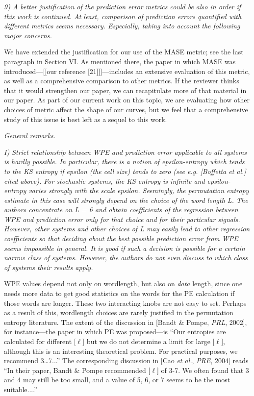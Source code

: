 \documentclass[12pt]{article}
\newcommand{\alert}[1]{{\color{red}#1}}
\begin{document}
\smallskip

\emph{9) A better justification of the prediction error metrics could
  be also in order if this work is continued. At least, comparison of
  prediction errors quantified with different metrics seems
  necessary. Especially, taking into account the following major
  concerns.}

We have extended the justification for our use of the MASE metric; see
the last paragraph in Section VI.  As mentioned there, the paper in
which MASE was introduced---\alert{[[our reference [21]]]}---includes
an extensive evaluation of this metric, as well as a comprehensive
comparison to other metrics.  If the reviewer thinks that it would
strengthen our paper, we can recapitulate more of that material in our
paper.  As part of our current work on this topic, we are evaluating
how other choices of metric affect the shape of our curves, but we
feel that a comprehensive study of this issue is best left as a sequel
to this work.

\smallskip

\noindent\emph{General remarks.}

\emph{I) Strict relationship between WPE and prediction error
  applicable to all systems is hardly possible. In particular, there
  is a notion of epsilon-entropy which tends to the KS entropy if
  epsilon (the cell size) tends to zero (see e.g.  [Boffetta et al.]
  cited above). For stochastic systems, the KS entropy is infinite and
  epsilon-entropy varies strongly with the scale epsilon. Seemingly,
  the permutation entropy estimate in this case will strongly depend
  on the choice of the word length L. The authors concentrate on L = 6
  and obtain coefficients of the regression between WPE and prediction
  error only for that choice and for their particular
  signals. However, other systems and other choices of L may easily
  lead to other regression coefficients so that deciding about the
  best possible prediction error from WPE seems impossible in
  general. It is good if such a decision is possible for a certain
  narrow class of systems. However, the authors do not even discuss to
  which class of systems their results apply.}

WPE values depend not only on wordlength, but also on \emph{data}
length, since one needs more data to get good statistics on the words
for the PE calculation if those words are longer.  These two
interacting knobs are not easy to set.  Perhaps as a result of this,
wordlength choices are rarely justified in the permutation entropy
literature.  The extent of the discussion in [Bandt \& Pompe, {\sl
    PRL}, 2002], for instance---the paper in which PE was
proposed---is ``Our entropies are calculated for different [$\ell$]
but we do not determine a limit for large [$\ell$], although this is
an interesting theoretical problem. For practical purposes, we
recommend 3\dots7...''  The corresponding discussion in [Cao {\sl et
    al.}, {\sl PRE}, 2004] reads ``In their paper, Bandt \& Pompe
recommended [$\ell$] of 3-7.  We often found that 3 and 4 may still be
too small, and a value of 5, 6, or 7 seems to be the most
suitable....''
\end{document}
